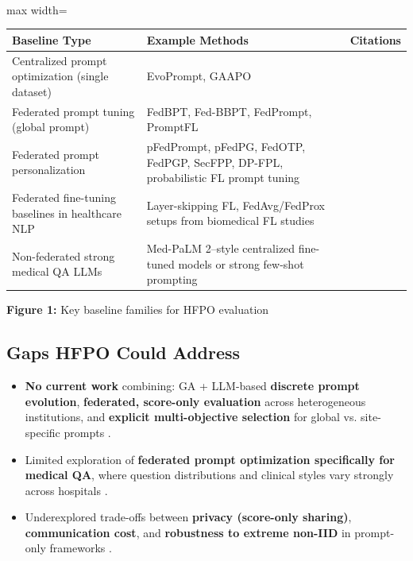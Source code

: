 \mbox{}\\
\begin{adjustbox}{max width=\textwidth}
\begin{tabular}{p{5.3cm} | p{5.3cm} | p{5.3cm}}
\hline
Baseline Type & Example Methods & Citations \\
\hline
Centralized prompt optimization (single dataset) & EvoPrompt, GAAPO & \cite{Weng2025Probabilistic} \cite{S'echeresse2025GAAPO:} \cite{Guo2022PromptFL:} \\
Federated prompt tuning (global prompt) & FedBPT, Fed-BBPT, FedPrompt, PromptFL & \cite{Sun2023FedBPT:} \cite{Li2024Federated} \cite{Zhao2022FedPrompt:} \cite{Lin2023Efficient} \cite{Zhang2025Federated} \\
Federated prompt personalization & pFedPrompt, pFedPG, FedOTP, FedPGP, SecFPP, DP-FPL, probabilistic FL prompt tuning & \cite{Tran2025Privacy-Preserving} \cite{Singhal2025Toward} \cite{Abdolmaleki2025Sync-GWO:} \\
Federated fine-tuning baselines in healthcare NLP & Layer-skipping FL, FedAvg/FedProx setups from biomedical FL studies & \cite{Jiang2025Fine-tuning} \cite{Wang2025Multi-Modal} \\
Non-federated strong medical QA LLMs & Med-PaLM 2–style centralized fine-tuned models or strong few-shot prompting & \cite{Guo2023Connecting} \cite{Wang2025Multi-Modal} \\
\hline
\end{tabular}
\end{adjustbox}


\textbf{Figure 1:} Key baseline families for HFPO evaluation


\subsection*{Gaps HFPO Could Address}


\begin{itemize}
\item \textbf{No current work} combining: GA + LLM-based \textbf{discrete prompt evolution}, \textbf{federated, score-only evaluation} across heterogeneous institutions, and \textbf{explicit multi-objective selection} for global vs. site-specific prompts  \cite{Sun2023FedBPT:} \cite{Lin2023Efficient} \cite{Wu2024FedDTPT:} \cite{Weng2025Probabilistic} \cite{S'echeresse2025GAAPO:} \cite{Singhal2025Toward} \cite{Abdolmaleki2025Sync-GWO:}.
\item Limited exploration of \textbf{federated prompt optimization specifically for medical QA}, where question distributions and clinical styles vary strongly across hospitals  \cite{Guo2023Connecting} \cite{Peng2024An} \cite{Wang2025Multi-Modal} \cite{Li2026Evolutionary-Algorithm-Based}.
\item Underexplored trade-offs between \textbf{privacy (score-only sharing)}, \textbf{communication cost}, and \textbf{robustness to extreme non-IID} in prompt-only frameworks  \cite{Sun2023FedBPT:} \cite{Li2024Federated} \cite{Lin2023Efficient} \cite{Wu2024FedDTPT:} \cite{Singhal2025Toward} \cite{Abdolmaleki2025Sync-GWO:}.
\end{itemize}


